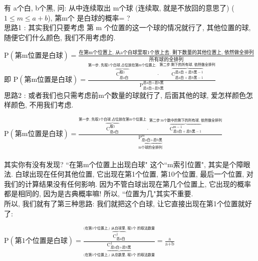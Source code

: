 \documentclass[UTF8]{ctexart}
\begin{document}
\begin{myEnvSample}
	有 a个白, b个黑, 问: 从中连续取出 m个球 (连续取, 就是不放回的意思了) ($1 \leq m \leq a+b$), 第m个 是白球的概率= ? \\
	
	思路1 : 其实我们只要考虑 第 m 个位置的这一个球的情况就行了, 其他位置的球,随便它们什么颜色, 我们不用考虑的.
	
	$\text{P}\left( \text{第m位置是白球} \right) =\frac{\text{在第m个位置上,\ 从a个白球里取1个放上去.\ 剩下数量的其他位置上,\ 依然做全排列}}{\text{所有球的全排列}}
	$ \\
	
	即 $	\text{P}\left( \text{第m位置是白球} \right) =\frac{\overset{\text{第一步,\ 先取1个白球,占位放在第m个位置上.}}{\overbrace{\text{C}_{\text{总a白}}^{\text{取}1}}}\cdot \overset{\text{第二步:剩下的所有球,\ 依然做全排列}}{\overbrace{\text{C}_{\text{总a白}+\text{总b黑}-1}^{\text{总a白}+\text{总b黑}-1}}}}{\text{P}_{\text{总a白}+\text{总b黑}}^{\text{总a白}+\text{总b黑}}}
	$ \\
	
	
	思路2 : 或者我们也只需考虑前m个数量的球就行了, 后面其他的球, 爱怎样颜色怎样颜色, 不用我们考虑.
	
	$	\text{P}\left( \text{第m位置是白球} \right) =\frac{\overset{\text{第一步,\ 先取1个白球,占位放在第m个位置上}}{\overbrace{\text{C}_{\text{总a白}}^{\text{取}1}}}\cdot \overset{\text{第二步:m个数中的剩下的所有球,\ 依然做全排列}}{\overbrace{\text{C}_{\text{总a白}+\text{总b黑}-1}^{\text{m}-1}}}}{\underset{\text{m个球的全排列}}{\underbrace{\text{P}_{\text{总a白}+\text{总b黑}}^{\text{m}}}}}
	$ \\
	\\
	
	其实你有没有发现? ``在第m个位置上出现白球" 这个``m索引位置", 其实是个障眼法. 白球出现在任何其他位置, 它出现在第1个位置, 第10个位置, 最后一个位置, 对我们的计算结果没有任何影响.  因为不管白球出现在第几个位置上, 它出现的概率都是相同的, 因为是古典概率嘛! 所以, ``位置为几"其实不重要. \\
	
	所以, 我们就有了第三种思路: 我们就把这个白球, 让它直接出现在第1个位置就好了:
	
	$	\text{P}\left( \text{第1个位置是白球} \right) =\frac{\overset{\text{(在第1个位置上,)\ 从白球里,\ 取1个\ 的取法数量}}{\overbrace{\text{C}_{\text{总a白}}^{1}}}}{\underset{\text{(在第1个位置上,)\ 从总数里,\ 取1个\ 的取法数量}}{\underbrace{\text{C}_{\text{总a白}+\text{总b黑}}^{1}}}}=\frac{\text{a}}{\text{a}+\text{b}}
	$		
\end{myEnvSample}
\end{document}
